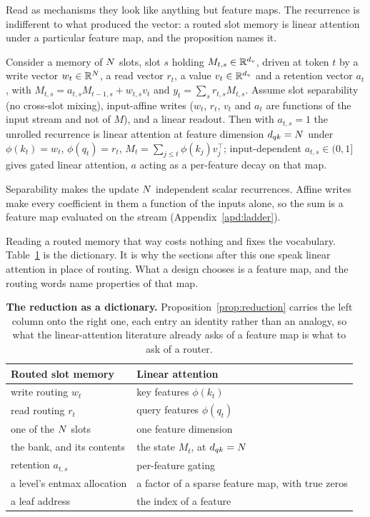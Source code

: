 Read as mechanisms they look like anything but feature maps. The recurrence is indifferent to what produced the vector: a routed slot memory is linear attention under a particular feature map, and the proposition names it.

\begin{proposition}
\label{prop:reduction}
Consider a memory of $N$ slots, slot $s$ holding $M_{t,s} \in \mathbb{R}^{d_v}$, driven at token $t$ by a write vector $w_t \in \mathbb{R}^{N}$, a read vector $r_t$, a value $v_t \in \mathbb{R}^{d_v}$ and a retention vector $a_t$, with $M_{t,s} = a_{t,s} M_{t-1,s} + w_{t,s} v_t$ and $y_t = \textstyle\sum_s r_{t,s} M_{t,s}$. Assume slot separability (no cross-slot mixing), input-affine writes ($w_t$, $r_t$, $v_t$ and $a_t$ are functions of the input stream and not of $M$), and a linear readout. Then with $a_{t,s} = 1$ the unrolled recurrence is linear attention at feature dimension $d_{qk} = N$ under $\phi(k_t) = w_t$, $\phi(q_t) = r_t$, $M_t = \textstyle\sum_{j \le t} \phi(k_j) v_j^\top$; input-dependent $a_{t,s} \in (0,1]$ gives gated linear attention, $a$ acting as a per-feature decay on that map.
\end{proposition}

Separability makes the update $N$ independent scalar recurrences. Affine writes make every coefficient in them a function of the inputs alone, so the sum is a feature map evaluated on the stream (Appendix~\ref{apd:ladder}).

Reading a routed memory that way costs nothing and fixes the vocabulary. Table~\ref{tab:translate} is the dictionary. It is why the sections after this one speak linear attention in place of routing. What a design chooses is a feature map, and the routing words name properties of that map.

\begin{table}[H]
\centering
\scriptsize
\caption{\textbf{The reduction as a dictionary.} Proposition~\ref{prop:reduction} carries the left column onto the right one, each entry an identity rather than an analogy, so what the linear-attention literature already asks of a feature map is what to ask of a router.}
\label{tab:translate}
\setlength{\tabcolsep}{6pt}
\begin{tabular}{@{}ll@{}}
\toprule
Routed slot memory & Linear attention \\
\midrule
write routing $w_t$          & key features $\phi(k_t)$ \\
read routing $r_t$           & query features $\phi(q_t)$ \\
one of the $N$ slots      & one feature dimension \\
the bank, and its contents   & the state $M_t$, at $d_{qk} = N$ \\
retention $a_{t,s}$          & per-feature gating \\
a level's entmax allocation  & a factor of a sparse feature map, with true zeros \\
a leaf address               & the index of a feature \\
\bottomrule
\end{tabular}
\end{table}

